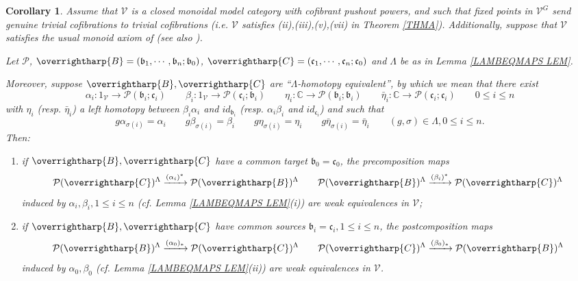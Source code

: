 \documentclass[a4paper,10pt
,draft
]{article}%
\numberwithin{equation}{section}
\numberwithin{figure}{section}
\newtheorem{corollary}[equation]{Corollary}%
\theoremstyle{definition} %
\newcommand{\vect}[1]{\text{\overrightharp{\ensuremath{#1}}}}
\newcommand{\V}{\ensuremath{\mathcal V}}
\renewcommand{\P}{\ensuremath{\mathcal P}}
\newcommand{\1}{\ensuremath{\mathbbm 1}}%
\begin{document}
\begin{corollary}\label{ALBEETA COR}
Assume that $\V$ is a closed monoidal model category with cofibrant pushout powers,
and such that fixed points in $\V^G$ send genuine trivial cofibrations to trivial cofibrations
(i.e. $\V$ satisfies (ii),(iii),(v),(vii) in Theorem \ref{THMA}). Additionally, suppose 
that $\V$ satisfies the usual monoid axiom of \cite{SS00} (see also \cite[Rem. \ref{OC-MONAX_REM}]{BP_FCOP}).
      
Let $\P$, 
$\vect{B}=(\mathfrak{b}_1,\cdots,\mathfrak{b}_n;\mathfrak{b}_0)$,
$\vect{C}=(\mathfrak{c}_1,\cdots,\mathfrak{c}_n;\mathfrak{c}_0)$ 
and $\Lambda$ be as in 
Lemma \ref{LAMBEQMAPS LEM}.

Moreover, suppose 
$\vect{B},\vect{C}$
are ``$\Lambda$-homotopy equivalent'',
by which we mean that there exist 
\[
\alpha_i \colon 1_{\V} \to \P(\mathfrak{b}_i;\mathfrak{c}_i)
\qquad 
\beta_i \colon 1_{\V} \to \P(\mathfrak{c}_i;\mathfrak{b}_i)
\qquad
\eta_i \colon \mathbb{C} \to \P(\mathfrak{b}_i;\mathfrak{b}_i)
\qquad
\bar{\eta}_i \colon \mathbb{C} \to \P(\mathfrak{c}_i;\mathfrak{c}_i)
\qquad
0\leq i \leq n
\] 
with $\eta_i$ (resp. $\bar{\eta}_i$) a left homotopy between 
$\beta_i\alpha_i$ and $id_{\mathfrak{b}_i}$
(resp. 
$\alpha_i\beta_i$ and $id_{\mathfrak{c}_i}$)
and such that
\[
g \alpha_{\sigma(i)} = \alpha_i \qquad
g \beta_{\sigma(i)} = \beta_i \qquad
g \eta_{\sigma(i)} = \eta_i \qquad
g \bar{\eta}_{\sigma(i)} = \bar{\eta}_i \qquad
(g,\sigma) \in \Lambda,0\leq i \leq n.
\]
Then:
\begin{enumerate}[label=(\roman*)]
\item if $\vect{B},\vect{C}$ have a common target $\mathfrak{b}_0=\mathfrak{c}_0$, the precomposition maps
\[
\P(\vect{C})^{\Lambda} \xrightarrow{(\alpha_i)^{\**}} \P(\vect{B})^{\Lambda}
\qquad
\P(\vect{B})^{\Lambda} \xrightarrow{(\beta_i)^{\**}}
\P(\vect{C})^{\Lambda}
\]
induced by $\alpha_i,\beta_i,1\leq i \leq n$ 
(cf. Lemma \ref{LAMBEQMAPS LEM}(i)) are weak equivalences in $\V$;
\item if $\vect{B},\vect{C}$ have common sources $\mathfrak{b}_i=\mathfrak{c}_i, 1 \leq i \leq n$, the postcomposition maps
\[
\P(\vect{B})^{\Lambda} \xrightarrow{(\alpha_0)_{\**}}
\P(\vect{C})^{\Lambda}
\qquad
\P(\vect{C})^{\Lambda} \xrightarrow{(\beta_0)_{\**}}
\P(\vect{B})^{\Lambda}
\]
induced by $\alpha_0,\beta_0$
(cf. Lemma \ref{LAMBEQMAPS LEM}(ii))
are weak equivalences in $\V$.
\end{enumerate}
\end{corollary}
\end{document}
